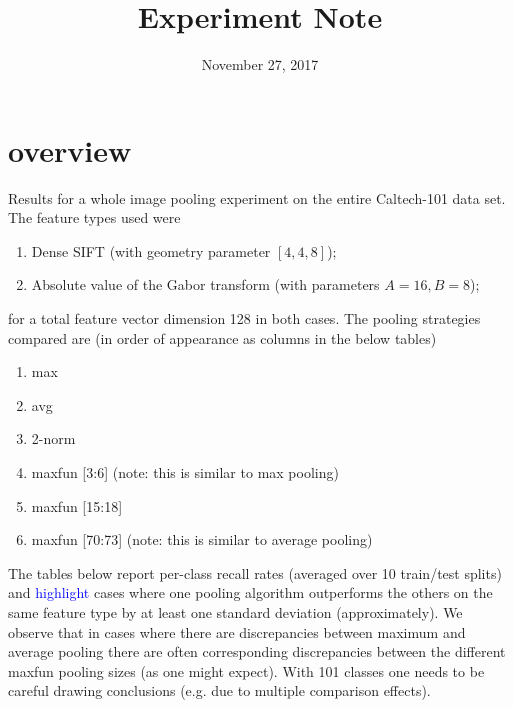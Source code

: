 \documentclass[10pt]{article}
\title{Experiment Note}
\date{November 27, 2017}
\newcommand{\hl}[1]{\textcolor{blue}{#1}}
\begin{document}
\maketitle

\section*{overview}
Results for a whole image pooling experiment on the entire Caltech-101 data set.  The feature types used were
\begin{enumerate}
\item Dense SIFT (with geometry parameter $[4, 4, 8]$);
\item Absolute value of the Gabor transform (with parameters $A=16, B=8$);
\end{enumerate}
%
for a total feature vector dimension 128 in both cases.
The pooling strategies compared are (in order of appearance as columns in the below tables)
%
\begin{enumerate}
\item max
\item avg
\item 2-norm
\item maxfun [3:6]       (note: this is similar to max pooling)
\item maxfun [15:18]
\item maxfun [70:73]  (note: this is similar to average pooling)
\end{enumerate}


The tables below report per-class recall rates (averaged over 10 train/test splits) and \hl{highlight} cases where one pooling algorithm outperforms the others on the same feature type by at least one standard deviation (approximately).
We observe that in cases where there are discrepancies between maximum and average pooling there are often corresponding discrepancies between the different maxfun pooling sizes (as one might expect).
With 101 classes one needs to be careful drawing conclusions (e.g. due to multiple comparison effects).
\end{document}
